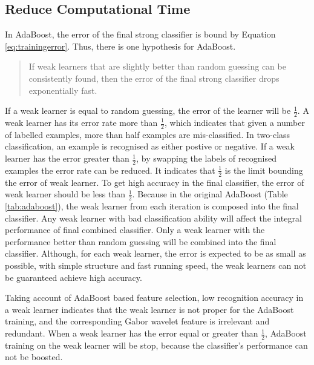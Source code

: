 \subsection{Reduce Computational Time}
\label{sec:faceveri:time}
In AdaBoost, the error of the final strong classifier is bound by \mbox{Equation} \ref{eq:trainingerror}. Thus, there is one hypothesis for AdaBoost. 
\begin{quote}
 If weak learners that are slightly better than random guessing can be consistently found, then the error of the final strong classifier drops exponentially fast.
\end{quote}
If a weak learner is equal to random guessing, the error of the learner will be $\frac{1}{2}$. A weak learner has its error rate more than $\frac{1}{2}$, which indicates that given a number of labelled examples, more than half examples are mis-classified. In two-class classification, an example is recognised as either postive or negative. If a weak learner has the error greater than $\frac{1}{2}$, by swapping the labels of recognised examples the error rate can be reduced. It indicates that $\frac{1}{2}$ is the limit bounding the error of weak learner. To get high accuracy in the final classifier, the error of weak learner should be less than $\frac{1}{2}$. Because in the original AdaBoost (\mbox{Table} \ref{tab:adaboost}), the weak learner from each iteration is composed into the final classifier. Any weak learner with bad classification ability will affect the integral performance of final combined classifier. Only a weak learner with the performance better than random guessing will be combined into the final classifier. Although, for each weak learner, the error is expected to be as small as possible, with simple structure and fast running speed, the weak learners can not be guaranteed achieve high accuracy.

Taking account of AdaBoost based feature selection, low recognition accuracy in a weak learner indicates that the weak learner is not proper for the AdaBoost training, and the corresponding Gabor wavelet feature is irrelevant and redundant.  When a weak learner has the error equal or greater than $\frac{1}{2}$, AdaBoost training on the weak learner will be stop, because the classifier's performance can not be boosted. 

